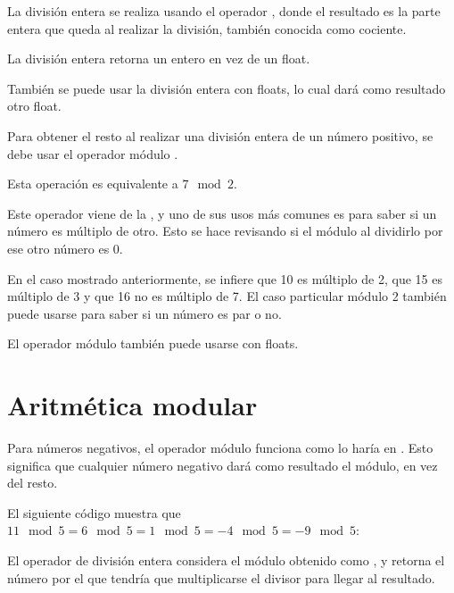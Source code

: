 La división entera se realiza usando el operador \ttt{//}, donde el resultado es la parte entera que queda al realizar la división, también conocida como cociente.


La división entera retorna un entero en vez de un float.


También se puede usar la división entera con floats, lo cual dará como resultado otro float.


Para obtener el resto al realizar una división entera de un número positivo, se debe usar el operador módulo \ttt{\%}.


Esta operación es equivalente a $7 \mod{2}$.

Este operador viene de la , y uno de sus usos más comunes es para saber si un número es múltiplo de otro.
Esto se hace revisando si el módulo al dividirlo por ese otro número es 0.


En el caso mostrado anteriormente, se infiere que 10 es múltiplo de 2, que 15 es múltiplo de 3 y que 16 no es múltiplo de 7.
El caso particular módulo 2 también puede usarse para saber si un número es par o no.

El operador módulo \ttt{\%} también puede usarse con floats.


\section{Aritmética modular}

Para números negativos, el operador módulo \ttt{\%} funciona como lo haría en .
Esto significa que cualquier número negativo dará como resultado el módulo, en vez del resto.

El siguiente código muestra que $11 \mod 5 = 6 \mod 5 = 1 \mod 5 = -4 \mod 5 = -9 \mod 5$:


El operador de división entera \ttt{//} considera el módulo obtenido como , y retorna el número por el que tendría que multiplicarse el divisor para llegar al resultado.

